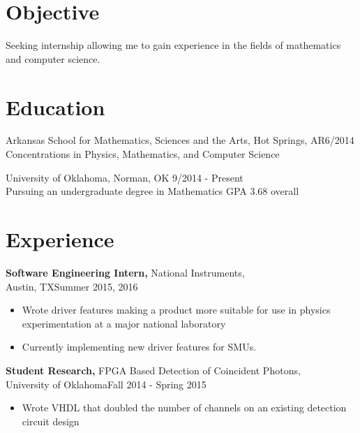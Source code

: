 \documentclass[margin]{res}
\begin{document}
 
 
 
\address{{\bf Permanent Address} \\ 1704 Mill St. \\ Conway, AR 72034 }
\address{{\bf Contact Information} \\ (501) 208-6274 \\ bryanr@ou.edu }

 
\begin{resume} 
 
\section{Objective} 
 Seeking internship allowing me to gain experience in the fields of mathematics and computer science.

\section{Education} 
Arkansas School for Mathematics, Sciences and the Arts, Hot Springs, AR\hfill	6/2014 \\
Concentrations in Physics, Mathematics, and Computer Science 

University of Oklahoma, Norman, OK \hfill 9/2014 - Present\\
Pursuing an undergraduate degree in Mathematics GPA 3.68 overall

 

\section{Experience}
{\bf Software Engineering Intern,} National Instruments, \\ Austin, TX\hfill Summer 2015, 2016
\begin{itemize} \itemsep -2pt  %
\item Wrote driver features making a product more suitable for use in physics experimentation at a major national laboratory
\item Currently implementing new driver features for SMUs.
\end{itemize}

{\bf Student Research,} FPGA Based Detection of Coincident Photons, \\ University of Oklahoma\hfill  Fall 2014 - Spring 2015
\begin{itemize} \itemsep -2pt %
\item Wrote VHDL that doubled the number of channels on an existing detection circuit design
\end{itemize}


\end{resume}
\end{document}
